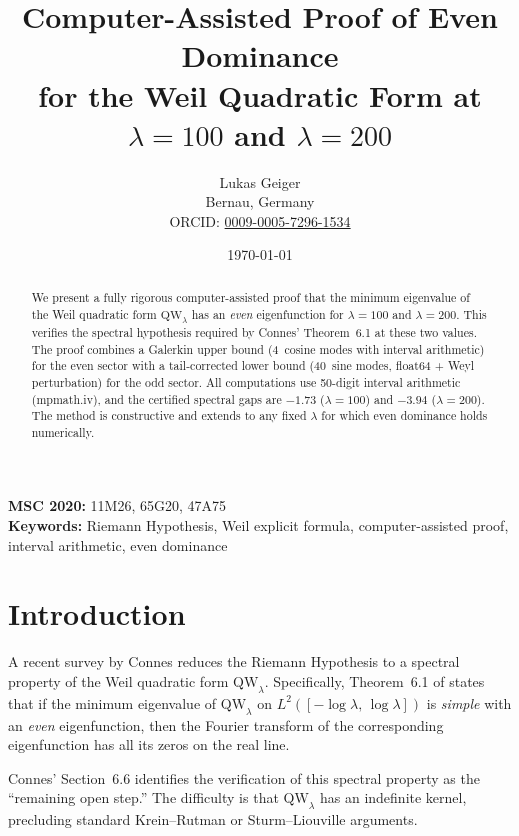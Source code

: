 \documentclass[12pt,a4paper]{article}
\title{Computer-Assisted Proof of Even Dominance\\
for the Weil Quadratic Form at $\lambda = 100$ and $\lambda = 200$}
\author{Lukas Geiger\\
\small Bernau, Germany\\
\small ORCID: \href{https://orcid.org/0009-0005-7296-1534}{0009-0005-7296-1534}}
\date{\today}
\theoremstyle{definition}
\theoremstyle{remark}
\begin{document}
\maketitle

\begin{abstract}
We present a fully rigorous computer-assisted proof that the minimum eigenvalue of the Weil quadratic form $\mathrm{QW}_\lambda$ has an \emph{even} eigenfunction for $\lambda = 100$ and $\lambda = 200$. This verifies the spectral hypothesis required by Connes' Theorem~6.1 \cite{Connes2025} at these two values. The proof combines a Galerkin upper bound (4~cosine modes with interval arithmetic) for the even sector with a tail-corrected lower bound (40~sine modes, float64 + Weyl perturbation) for the odd sector. All computations use 50-digit interval arithmetic (mpmath.iv), and the certified spectral gaps are $-1.73$ ($\lambda = 100$) and $-3.94$ ($\lambda = 200$). The method is constructive and extends to any fixed $\lambda$ for which even dominance holds numerically.
\end{abstract}

\noindent\textbf{MSC 2020:} 11M26, 65G20, 47A75\\
\textbf{Keywords:} Riemann Hypothesis, Weil explicit formula, computer-assisted proof, interval arithmetic, even dominance

\tableofcontents


\section{Introduction}
\label{sec:intro}

A recent survey by Connes \cite{Connes2025} reduces the Riemann Hypothesis to a spectral property of the Weil quadratic form $\mathrm{QW}_\lambda$. Specifically, Theorem~6.1 of \cite{Connes2025} states that if the minimum eigenvalue of $\mathrm{QW}_\lambda$ on $L^2([-\log\lambda,\,\log\lambda])$ is \emph{simple} with an \emph{even} eigenfunction, then the Fourier transform of the corresponding eigenfunction has all its zeros on the real line.

Connes' Section~6.6 identifies the verification of this spectral property as the ``remaining open step.'' The difficulty is that $\mathrm{QW}_\lambda$ has an indefinite kernel, precluding standard Krein--Rutman or Sturm--Liouville arguments.
\end{document}

